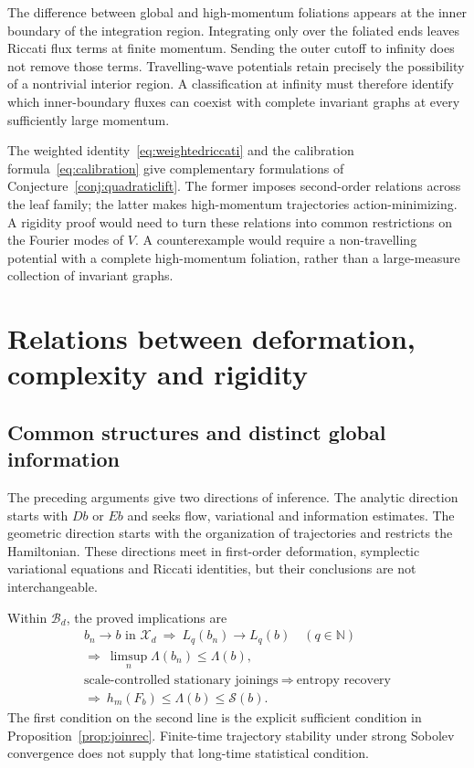 \documentclass[review,12pt,times,a4paper,nopreprintline]{elsarticle}
\theoremstyle{plain}
\theoremstyle{definition}
\theoremstyle{remark}
\newcommand{\N}{\mathbb N}
\newcommand{\B}{\mathscr B}
\newcommand{\X}{\mathscr X}
\newcommand{\action}{\mathcal S}
\numberwithin{equation}{section}
\begin{document}
The difference between global and high-momentum foliations appears at the inner boundary of the integration region. Integrating only over the foliated ends leaves Riccati flux terms at finite momentum. Sending the outer cutoff to infinity does not remove those terms. Travelling-wave potentials retain precisely the possibility of a nontrivial interior region. A classification at infinity must therefore identify which inner-boundary fluxes can coexist with complete invariant graphs at every sufficiently large momentum.

The weighted identity~\eqref{eq:weightedriccati} and the calibration formula~\eqref{eq:calibration} give complementary formulations of Conjecture~\ref{conj:quadraticlift}. The former imposes second-order relations across the leaf family; the latter makes high-momentum trajectories action-minimizing. A rigidity proof would need to turn these relations into common restrictions on the Fourier modes of $V$. A counterexample would require a non-travelling potential with a complete high-momentum foliation, rather than a large-measure collection of invariant graphs.

\section{Relations between deformation, complexity and rigidity}\label{sec:relations}

\subsection{Common structures and distinct global information}
The preceding arguments give two directions of inference. The analytic direction starts with $Db$ or $Eb$ and seeks flow, variational and information estimates. The geometric direction starts with the organization of trajectories and restricts the Hamiltonian. These directions meet in first-order deformation, symplectic variational equations and Riccati identities, but their conclusions are not interchangeable.

Within $\B_d$, the proved implications are
\begin{equation}\label{eq:logicentropy}
 \begin{gathered}
 b_n\to b\text{ in }\X_d
 \ \Longrightarrow\ L_q(b_n)\to L_q(b)\quad(q\in\N)\\
 \Longrightarrow\ \limsup_n\Lambda(b_n)\leq\Lambda(b),\\[3pt]
 \text{scale-controlled stationary joinings}
 \ \Longrightarrow\ \text{entropy recovery}\\
 \Longrightarrow\ h_m(F_b)\leq\Lambda(b)\leq\action(b).
 \end{gathered}
\end{equation}
The first condition on the second line is the explicit sufficient condition in Proposition~\ref{prop:joinrec}. Finite-time trajectory stability under strong Sobolev convergence does not supply that long-time statistical condition.
\end{document}
